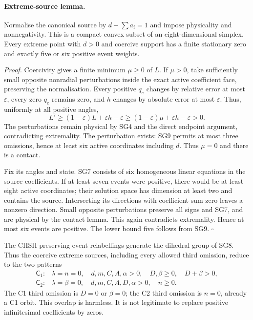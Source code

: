 \paragraph{Extreme-source lemma.}
Normalise the canonical source by $d+\sum a_i=1$ and impose
physicality and nonnegativity.  This is a compact convex subset of
an eight-dimensional simplex.  Every extreme point with $d>0$ and
coercive support has a finite stationary zero and exactly five or
six positive event weights.

\emph{Proof.}
Coercivity gives a finite minimum $\mu\geq0$ of $L$.  If $\mu>0$,
take sufficiently small opposite nonradial perturbations inside the
exact active coefficient face, preserving the normalisation.  Every
positive $q_e$ changes by relative error at most $\varepsilon$,
every zero $q_e$ remains zero, and $h$ changes by absolute error at
most $\varepsilon$.  Thus, uniformly at all positive angles,
\[
 L'\geq(1-\varepsilon)L+\varepsilon h-\varepsilon
       \geq(1-\varepsilon)\mu+\varepsilon h-\varepsilon>0.
\]
The perturbations remain physical by SG4 and the direct endpoint
argument, contradicting extremality.  The perturbation exists:
SG9 permits at most three omissions, hence at least six active
coordinates including $d$.  Thus $\mu=0$ and there is a contact.

Fix its angles and state.  SG7 consists of six homogeneous linear
equations in the source coefficients.  If at least seven events
were positive, there would be at least eight active coordinates;
their solution space has dimension at least two and contains the
source.  Intersecting its directions with coefficient sum zero
leaves a nonzero direction.  Small opposite perturbations preserve
all signs and SG7, and are physical by the contact lemma.  This again
contradicts extremality.  Hence at most six events are positive.
The lower bound five follows from SG9. \hfill$\square$

The CHSH-preserving event relabellings generate the dihedral group
of SG8.  Thus the coercive extreme sources, including every allowed
third omission, reduce to the two patterns
\[
\begin{array}{ll}
\mathsf C_1:&\lambda=n=0,\quad d,m,C,A,\alpha>0,
                  \quad D,\beta\geq0,\quad D+\beta>0,\\
\mathsf C_2:&\lambda=\beta=0,\quad d,m,C,A,D,\alpha>0,
                  \quad n\geq0.
\end{array}                                                     \tag{SG10}
\]
The C1 third omission is $D=0$ or $\beta=0$; the C2 third omission
is $n=0$, already a C1 orbit.  This overlap is harmless.  It is not
legitimate to replace positive infinitesimal coefficients by zeros.

